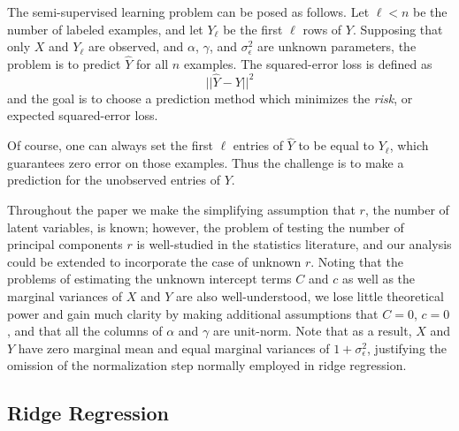\documentclass[11pt]{article}
\begin{document}
The semi-supervised learning problem can be posed as follows.  Let
$\ell < n$ be the number of labeled examples, and let $Y_\ell$ be the
first $\ell$ rows of $Y$.  Supposing that only $X$ and $Y_\ell$ are
observed, and $\alpha$, $\gamma$, and $\sigma^2_\epsilon$ are unknown
parameters, the problem is to predict $\hat{Y}$ for all $n$ examples.
The squared-error loss is defined as
\[
||\hat{Y} - Y||^2
\]
and the goal is to choose a prediction method which minimizes the
\emph{risk}, or expected squared-error loss.

Of course, one can always set the first $\ell$ entries of $\hat{Y}$ to be
equal to $Y_\ell$, which guarantees zero error on those examples.  Thus the
challenge is to make a prediction for the unobserved entries of $Y$.

Throughout the paper we make the simplifying assumption that $r$, the
number of latent variables, is known; however, the problem of testing
the number of principal components $r$ is well-studied in the
statistics literature, and our analysis could be extended to
incorporate the case of unknown $r$.  Noting that the problems of
estimating the unknown intercept terms $C$ and $c$ as well as the
marginal variances of $X$ and $Y$ are also well-understood, we lose
little theoretical power and gain much clarity by making additional
assumptions that $C=0$, $c=0$, and that all the columns of $\alpha$
and $\gamma$ are unit-norm.  Note that as a result, $X$ and $Y$ have
zero marginal mean and equal marginal variances of $1 +
\sigma_\epsilon^2$, justifying the omission of the normalization step
normally employed in ridge regression.

\subsection{Ridge Regression}
\end{document}
